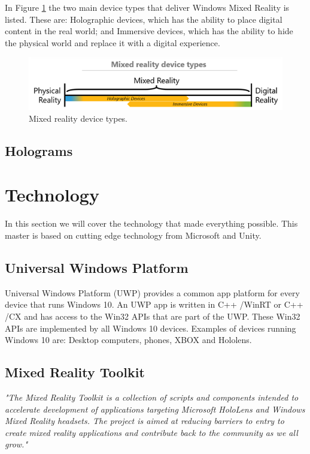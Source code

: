    In Figure \ref{fig:mrdevicetypes} the two main device types that deliver Windows Mixed Reality is listed. These are: Holographic devices, which has the ability to place digital content in the real world;\cite{wdc-mr} and Immersive devices, which has the ability to hide the physical world and replace it with a digital experience.\cite{wdc-mr} 
    \begin{figure}[!ht]
        \centering
        \includegraphics[scale=1]{figures/mixedrealityspectrumdevicetypes.png}
        \caption{Mixed reality device types.\cite{wdc-mr}}
        \label{fig:mrdevicetypes}
    \end{figure}
    
    \subsection{Holograms}

\section{Technology}
In this section we will cover the technology that made everything possible. This master is based on cutting edge technology from Microsoft and Unity.

    \subsection{Universal Windows Platform}
    Universal Windows Platform (UWP) provides a common app platform for every device that runs Windows 10. An UWP app is written in C++ /WinRT or C++ /CX and has access to the Win32 APIs that are part of the UWP. These Win32 APIs are implemented by all Windows 10 devices.\cite{wdc-UWP} Examples of devices running Windows 10 are: Desktop computers, phones, XBOX and Hololens.
    
    \subsection{Mixed Reality Toolkit}
    \emph{"The Mixed Reality Toolkit is a collection of scripts and components intended to accelerate development of applications targeting Microsoft HoloLens and Windows Mixed Reality headsets. The project is aimed at reducing barriers to entry to create mixed reality applications and contribute back to the community as we all grow."}\cite{MRToolkitReadme}

